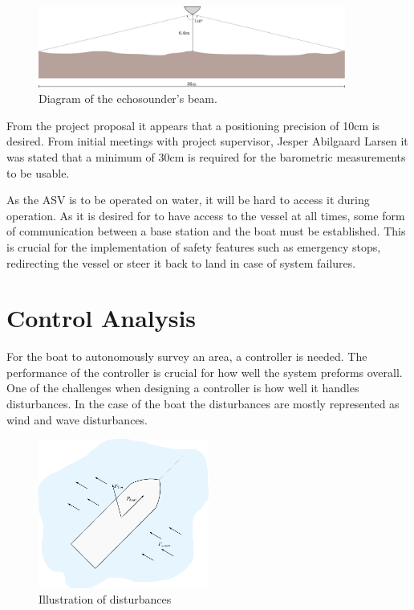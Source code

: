 \begin{figure}[H]
    \includegraphics[width=0.9\textwidth]{figures/echosounder}
    \caption{Diagram of the echosounder's beam.}
    \label{fig:echosounder}
\end{figure}

From the project proposal it appears that a positioning precision of 10cm is desired. 
From initial meetings with project supervisor, Jesper Abilgaard Larsen it was stated that a minimum of 30cm is required for the barometric measurements to be usable.

As the ASV is to be operated on water, it will be hard to access it during operation. 
As it is desired for to have access to the vessel at all times, some form of communication between a base station and the boat must be established. 
This is crucial for the implementation of safety features such as emergency stops, redirecting the vessel or steer it back to land in case of system failures.

\section{Control Analysis}
For the boat to autonomously survey an area, a controller is needed. 
The performance of the controller is crucial for how well the system preforms overall. 
One of the challenges when designing a controller is how well it handles disturbances. 
In the case of the boat the disturbances are mostly represented as wind and wave disturbances. 
\begin{figure}[H]
    \includegraphics[width=0.5\textwidth]{figures/boatdisturbance}
    \caption{Illustration of disturbances}
    \label{fig:boatdist}
\end{figure}

